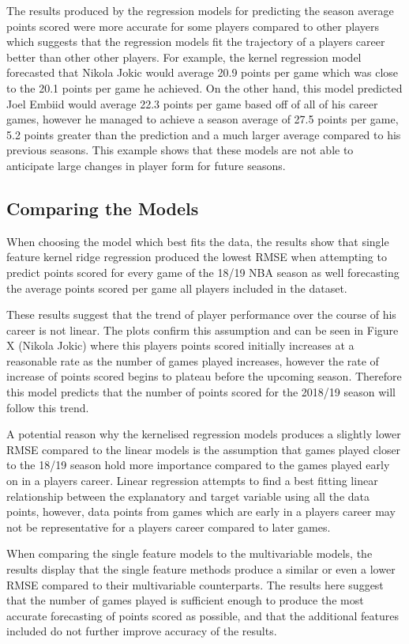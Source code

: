 \documentclass[a4paper,11pt,twoside]{article}
\begin{document}
The results produced by the regression models for predicting the season average points scored were more accurate for some players compared to other players which suggests that the regression models fit the trajectory of a players career better than other other players. For example, the kernel regression model forecasted that Nikola Jokic would average 20.9 points per game which was close to the 20.1 points per game he achieved. On the other hand, this model predicted Joel Embiid would average 22.3 points per game based off of all of his career games, however he managed to achieve a season average of 27.5 points per game, 5.2 points greater than the prediction and a much larger average compared to his previous seasons. This example shows that these models are not able to anticipate large changes in player form for future seasons.


\subsection{Comparing the Models}
When choosing the model which best fits the data, the results show that single feature kernel ridge regression produced the lowest RMSE when attempting to predict points scored for every game of the 18/19 NBA season as well forecasting the average points scored per game all players included in the dataset.

These results suggest that the trend of player performance over the course of his career is not linear. The plots confirm this assumption and can be seen in Figure X (Nikola Jokic) where this players points scored initially increases at a reasonable rate as the number of games played increases, however the rate of increase of points scored begins to plateau before the upcoming season. Therefore this model predicts that the number of points scored for the 2018/19 season will follow this trend.

A potential reason why the kernelised regression models produces a slightly lower RMSE compared to the linear models is the assumption that games played closer to the 18/19 season hold more importance compared to the games played early on in a players career. Linear regression attempts to find a best fitting linear relationship between the explanatory and target variable using all the data points, however, data points from games which are early in a players career may not be representative for a players career compared to later games.

When comparing the single feature models to the multivariable models, the results display that the single feature methods produce a similar or even a lower RMSE compared to their multivariable counterparts. The results here suggest that the number of games played is sufficient enough to produce the most accurate forecasting of points scored as possible, and that the additional features included do not further improve accuracy of the results.
\end{document}
